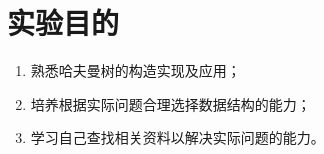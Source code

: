 \section{实验目的}
    \begin{enumerate}
        \item 熟悉哈夫曼树的构造实现及应用；
        \item 培养根据实际问题合理选择数据结构的能力；
        \item 学习自己查找相关资料以解决实际问题的能力。
    \end{enumerate}